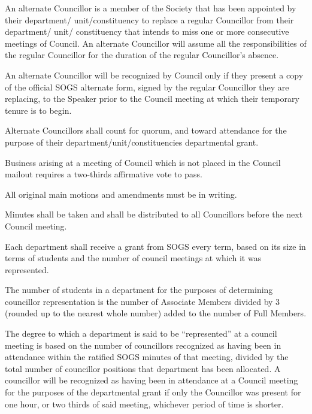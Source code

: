 \begin{longenum}[ label*=\thesubsection.\arabic*., align=left]
    \begin{longenum}[ label*=\arabic*., align=left]
		\item An alternate Councillor is a member of the Society that has been appointed by their department/ unit/constituency to replace a regular Councillor from their department/ unit/ constituency that intends to miss one or more consecutive meetings of Council. An alternate Councillor will assume all the responsibilities of the regular Councillor for the duration of the regular Councillor's absence.
        \item An alternate Councillor will be recognized by Council only if they present a copy of the official SOGS alternate form, signed by the regular Councillor they are replacing, to the Speaker prior to the Council meeting at which their temporary tenure is to begin. 
        \item Alternate Councillors shall count for quorum, and toward attendance for the purpose of their department/unit/constituencies departmental grant. 
	\end{longenum}
    \item Business arising at a meeting of Council which is not placed in the Council mailout requires a two-thirds affirmative vote to pass.
    \item All original main motions and amendments must be in writing.
    \item Minutes shall be taken and shall be distributed to all Councillors before the next Council meeting.
    \item Each department shall receive a grant from SOGS every term, based on its size in terms of students and the number of council meetings at which it was represented.
    \item The number of students in a department for the purposes of determining councillor representation is the number of Associate Members divided by 3 (rounded up to the nearest whole number) added to the number of Full Members. 
    \item The degree to which a department is said to be ``represented'' at a council meeting is based on the number of councillors recognized as having been in attendance within the ratified SOGS minutes of that meeting, divided by the total number of councillor positions that department has been allocated. A councillor will be recognized as having been in attendance at a Council meeting for the purposes of the departmental grant if only the Councillor was present for one hour, or two thirds of said meeting, whichever period of time is shorter. 

\end{longenum}

